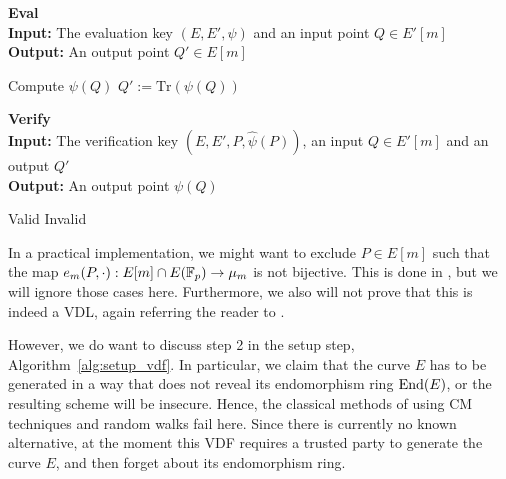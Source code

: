 \begin{algorithm}
    \caption{\label{alg:eval_vdf} \textbf{Eval}\\
    \textbf{Input:} The evaluation key $(E, E', \psi)$ and an input point $Q \in E'[m]$\\
    \textbf{Output:} An output point $Q' \in E[m]$}
    \begin{algorithmic}[1]
        \State Compute $\psi(Q)$
        \State\Return $Q' := \mathrm{Tr}(\psi(Q))$
    \end{algorithmic}
\end{algorithm}
\begin{algorithm}
    \caption{\label{alg:verify_vdf} \textbf{Verify}\\
    \textbf{Input:} The verification key $(E, E', P, \hat{\psi}(P))$, an input $Q \in E'[m]$ and an output $Q'$\\
    \textbf{Output:} An output point $\psi(Q)$}
    \begin{algorithmic}[1]
            \State\Return Valid
        \Else
            \State\Return Invalid
        \EndIf
    \end{algorithmic}
\end{algorithm}

In a practical implementation, we might want to exclude $P \in E[m]$ such that the map $e_m(P, \cdot): E[m] \cap E(\mathbb{F}_p) \to \mu_m$ is not bijective.
This is done in \cite{verifiable_delay_function}, but we will ignore those cases here.
Furthermore, we also will not prove that this is indeed a VDL, again referring the reader to \cite{verifiable_delay_function}.

However, we do want to discuss step 2 in the setup step, Algorithm~\ref{alg:setup_vdf}.
In particular, we claim that the curve $E$ has to be generated in a way that does not reveal its endomorphism ring $\mathrm{End}(E)$, or the resulting scheme will be insecure.
Hence, the classical methods of using CM techniques and random walks fail here.
Since there is currently no known alternative, at the moment this VDF requires a trusted party to generate the curve $E$, and then forget about its endomorphism ring.

